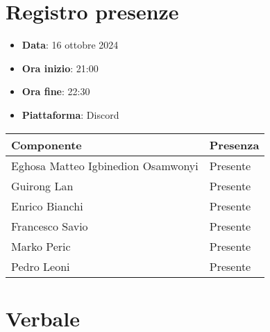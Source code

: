 \documentclass[a4paper, 12pt]{article}
\begin{document}
\section{Registro presenze}
\begin{itemize}
    \item[] \textbf{Data}: 16 ottobre 2024
    \item[] \textbf{Ora inizio}:  21:00
    \item[] \textbf{Ora fine}: 22:30
    \item[] \textbf{Piattaforma}: Discord	
\end{itemize}
\begin{table}[!h]
\centering
{\renewcommand{\arraystretch}{2}
\begin{tabularx}{\textwidth}{| X | X |}
    \hline
        \textbf{\large Componente} & 
        \textbf{\large Presenza} \\ 
    \hline 
    \hline
        Eghosa Matteo Igbinedion Osamwonyi&
        Presente \\
    \hline 
        Guirong Lan&
        Presente \\
    \hline 
        Enrico Bianchi&
        Presente \\
    \hline 
        Francesco Savio&
        Presente \\
    \hline 
        Marko Peric&
        Presente \\
    \hline 
        Pedro Leoni&
        Presente \\
    \hline 

\end{tabularx}}
\end{table}

\newpage

\section{Verbale}
\end{document}
